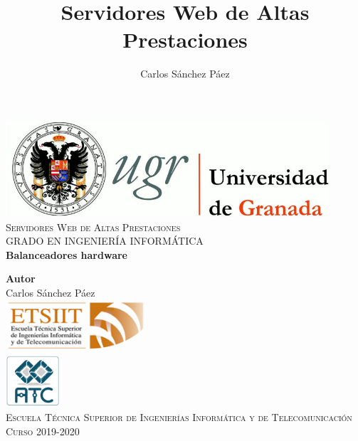 \documentclass[12pt,spanish]{article}
\title{Servidores Web de Altas Prestaciones}
\author{Carlos Sánchez Páez}
\begin{document}
\lstset{columns=fullflexible,basicstyle=\ttfamily}


\begin{titlepage}

 \newlength{\centeroffset}
 \setlength{\centeroffset}{-0.5\oddsidemargin}
 \addtolength{\centeroffset}{0.5\evensidemargin}
 \thispagestyle{empty}

 \noindent\hspace*{\centeroffset}
 \begin{minipage}{\textwidth}

  \centering
  \includegraphics[width=0.9\textwidth]{logo_ugr.jpg}\\[1.4cm]

  \textsc{ \Large Servidores Web de Altas Prestaciones\\[0.2cm]}
  \textsc{GRADO EN INGENIERÍA INFORMÁTICA}\\[1cm]

  {\Huge\bfseries Balanceadores hardware \\}
 \end{minipage}

 \vspace{1.5cm}
 \noindent\hspace*{\centeroffset}
 \begin{minipage}{\textwidth}
  \centering

  \textbf{Autor}\\ {Carlos Sánchez Páez}\\[2.5ex]
  \includegraphics[width=0.4\textwidth]{etsiit_logo.png}\\[0.1cm]
  \vspace{1.5cm}
  \includegraphics[width=0.15\textwidth]{atc.jpg}\\[0.1cm]
  \vspace{1cm}
  \textsc{Escuela Técnica Superior de Ingenierías Informática y de Telecomunicación}\\
  \vspace{1cm}
  \textsc{Curso 2019-2020}
 \end{minipage}
\end{titlepage}
\thispagestyle{empty}
\newpage
\end{document}
